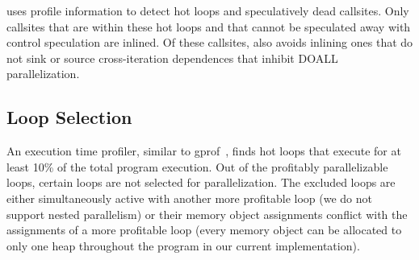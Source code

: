 \name uses profile information to detect hot loops and speculatively
dead callsites. Only callsites that are within these hot loops and
that cannot be speculated away with control speculation are inlined.
%
Of these callsites, \name also avoids inlining ones that do not
sink or source cross-iteration dependences that inhibit DOALL
parallelization.
%



\subsection{Loop Selection} An execution time profiler, similar to
gprof~\cite{gnu:binutils:web}, finds hot loops that execute for at least 10\%
of the total program execution.
%
%
Out of the profitably parallelizable loops, certain loops are not
selected for parallelization. The excluded loops are either
simultaneously active with another more profitable loop (we do not
support nested parallelism) or their memory object assignments
conflict with the assignments of a more profitable loop (every memory
object can be allocated to only one heap throughout the program in our
current implementation).




